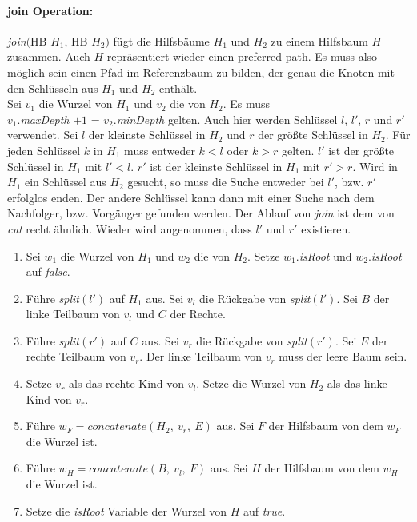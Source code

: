 \documentclass[a4paper,12pt]{article}
\begin{document}
\paragraph{join Operation:}
\noindent \textit{join}$($HB $H_1$, HB $H_2)$ fügt die Hilfsbäume $H_1$ und $H_2$ zu einem Hilfsbaum $H$ zusammen. Auch $H$ repräsentiert wieder einen preferred path. Es muss also möglich sein einen Pfad im Referenzbaum zu bilden, der genau die Knoten mit den Schlüsseln aus $H_1$ und $H_2$ enthält.\\ 
Sei $v_1$ die Wurzel von $H_1$ und $v_2$ die von $H_2$. Es muss \\ $v_1$.\textit{maxDepth} $+ 1$ =  $v_2$.\textit{minDepth} gelten. Auch hier werden Schlüssel $l$, $l'$, $r$ und $r'$ verwendet. Sei $l$ der kleinste Schlüssel in $H_2$ und $r$ der größte Schlüssel in $H_2$. 
Für jeden Schlüssel $k$ in $H_1$ muss entweder $k < l$ oder $k > r$ gelten. $l'$ ist der größte Schlüssel in $H_1$ mit $l' < l$. $r'$ ist der kleinste Schlüssel in $H_1$ mit $r' > r$. Wird in $H_1$ ein Schlüssel aus $H_2$ gesucht, so muss die Suche entweder bei $l'$, bzw. $r'$ erfolglos enden. Der andere Schlüssel kann dann mit einer Suche nach dem Nachfolger, bzw. Vorgänger gefunden werden. Der Ablauf von \textit{join} ist dem von \textit{cut} recht ähnlich. Wieder wird angenommen, dass $l'$ und $r'$ existieren.
\begin{enumerate}
	\item Sei $w_1$ die Wurzel von $H_1$ und $w_2$ die von $H_2$. Setze $w_1$.\textit{isRoot} und  $w_2$.\textit{isRoot} auf \textit{false}.
	\item Führe \textit{split}$\left(l'\right)$ auf $H_1$ aus. Sei $v_l$ die Rückgabe von \textit{split}$\left(l'\right)$. Sei $B$ der linke Teilbaum von $v_l$ und $C$ der Rechte. 
	\item Führe \textit{split}$\left(r'\right)$ auf $C$ aus. Sei $v_r$ die Rückgabe von \textit{split}$\left(r'\right)$. Sei $E$ der rechte Teilbaum von $v_r$. Der linke Teilbaum von $v_r$ muss der leere Baum sein. 
	\item Setze $v_r$ als das rechte Kind von $v_l$. Setze die Wurzel von $H_2$ als das linke Kind von $v_r$.
	\item Führe $w_F = \textit{concatenate}\left(H_2, ~ v_r, ~ E \right)$ aus. Sei $F$ der Hilfsbaum von dem $w_F$ die Wurzel ist.
	\item Führe $w_H = \textit{concatenate}\left(B, ~ v_l,~ F \right)$ aus. Sei $H$ der Hilfsbaum von dem $w_H$ die Wurzel ist.
	\item Setze die \textit{isRoot} Variable der Wurzel von $H$ auf \textit{true}.
\end{enumerate}
\end{document}
